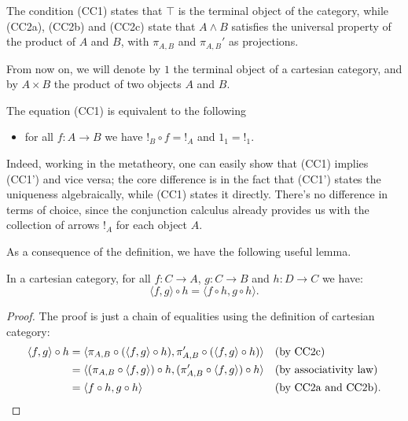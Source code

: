 The condition (CC1) states that $\top$ is the terminal object of the category, while (CC2a), (CC2b) and (CC2c) state that $A \land B$
satisfies the universal property of the product of $A$ and $B$, with $\pi_{A,B}$ and $\pi_{A,B}'$ as projections.

\begin{notation}\label{idx:products}
    From now on, we will denote by $1$ the terminal object of a cartesian category, and by $A \times B$ the product of two objects $A$ and $B$.
\end{notation}

\begin{remark}
    The equation (CC1) is equivalent to the following
    \begin{itemize}
        \item[(\textnormal{CC1'})] for all $f : A \to B$ we have $!_B \circ f = !_A$ and $1_1 = !_1$.
    \end{itemize}
    Indeed, working in the metatheory, one can easily show that (CC1) implies (CC1') and vice versa; the core difference is in the fact that (CC1') states the uniqueness algebraically, while (CC1) states it directly.
    There's no difference in terms of choice, since the conjunction calculus already provides us with the collection of arrows $!_A$ for each object $A$.
\end{remark}

As a consequence of the definition, we have the following useful lemma.

\begin{lemma}
    In a cartesian category, for all $f : C \to A$, $g : C \to B$ and $h : D \to C$ we have:
    \[ \langle f, g \rangle \circ h = \langle f \circ h, g \circ h\rangle. \]
\end{lemma}

\begin{proof}
    The proof is just a chain of equalities using the definition of cartesian category:
    \begin{align*}
        \langle f, g \rangle \circ h &= \langle \pi_{A,B} \circ (\langle f, g \rangle \circ h), \pi_{A,B}' \circ (\langle f, g \rangle \circ h)\rangle &&(\textnormal{by CC2c}) \\
                                   &= \langle (\pi_{A,B} \circ \langle f, g \rangle) \circ h, (\pi_{A,B}' \circ \langle f, g \rangle) \circ h\rangle &&(\textnormal{by associativity law}) \\
                                   &= \langle f \circ h, g \circ h\rangle &&(\textnormal{by CC2a and CC2b}).
    \end{align*}
\end{proof}

